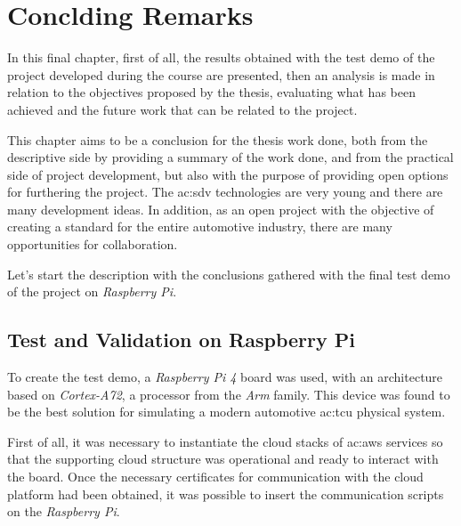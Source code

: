 \chapter{Conclding Remarks} \label{ch:concldingRemarks}
In this final chapter, first of all, the results obtained with the test demo of the project developed during the course are presented, then an analysis is made in relation to the objectives proposed by the thesis, evaluating what has been achieved and the future work that can be related to the project.

This chapter aims to be a conclusion for the thesis work done, both from the descriptive side by providing a summary of the work done, and from the practical side of project development, but also with the purpose of providing open options for furthering the project. The \gls{ac:sdv} technologies are very young and there are many development ideas. In addition, as an open project with the objective of creating a standard for the entire automotive industry, there are many opportunities for collaboration.

Let's start the description with the conclusions gathered with the final test demo of the project on \textit{Raspberry Pi}.

\section{Test and Validation on Raspberry Pi}
To create the test demo, a \textit{Raspberry Pi 4} board was used, with an architecture based on \textit{Cortex-A72}, a processor from the \textit{Arm} family. This device was found to be the best solution for simulating a modern automotive \gls{ac:tcu} physical system.

First of all, it was necessary to instantiate the cloud stacks of \gls{ac:aws} services so that the supporting cloud structure was operational and ready to interact with the board. Once the necessary certificates for communication with the cloud platform had been obtained, it was possible to insert the communication scripts on the \textit{Raspberry Pi}.

